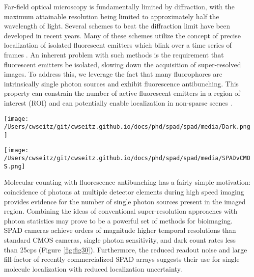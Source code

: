 Far-field optical microscopy is fundamentally limited by diffraction, with the maximum attainable resolution being limited to approximately half the wavelength of light. Several schemes to beat the diffraction limit have been developed in recent years. Many of these schemes utilize the concept of precise localization of isolated fluorescent emitters which blink over a time series of frames \parencite{Rust2006,Betzig2006}. An inherent problem with such methods is the requirement that fluorescent emitters be isolated, slowing down the acquisition of super-resolved images. To address this, we leverage the fact that many fluorophores are intrinsically single photon sources and exhibit fluorescence antibunching. This property can constrain the number of active fluorescent emitters in a region of interest (ROI) and can potentially enable localization in non-sparse scenes \parencite{Ta2010,Israel2017}. 

\begin{figure*}[t]
\centering
\texttt{[image: /Users/cwseitz/git/cwseitz.github.io/docs/phd/spad/spad/media/Dark.png]}
\caption{\textbf{Dark counts of the SPAD array}. (left) Average pixel-wise dark counts for a 100x100 pixel region exposed for 100ms (right) Variance of dark counts for 100ms exposure.}
\label{fig:fig30}
\end{figure*}    


\begin{figure*}[t]
\centering
\texttt{[image: /Users/cwseitz/git/cwseitz.github.io/docs/phd/spad/spad/media/SPADvCMOS.png]}
\caption{\textbf{Comparison of quantum dot images between CMOS and SPAD cameras}. (left) SPAD image of Qdot655 coated on a glass coverslip using a 100X/1.4NA oil-immersion objective (Nikon) and a 10ms exposure time. (right) CMOS image of Qdot655 using a 60X/1.4NA oil-immersion objective (Olympus) and a 10ms exposure time. Both use continuous-wave 640nm excitation}
\label{fig:fig4}
\end{figure*}    

Molecular counting with fluorescence antibunching has a fairly simple motivation: coincidence of photons at multiple detector elements during high speed imaging provides evidence for the number of single photon sources present in the imaged region. Combining the ideas of conventional super-resolution approaches with photon statistics may prove to be a powerful set of methods for bioimaging. SPAD cameras achieve orders of magnitude higher temporal resolutions than standard CMOS cameras, single photon sensitivity, and dark count rates less than 25cps (Figure \ref{fig:fig30}). Furthermore, the reduced readout noise and large fill-factor of recently commercialized SPAD arrays suggests their use for single molecule localization with reduced localization uncertainty.

